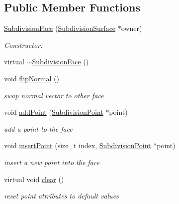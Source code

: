 \subsection*{Public Member Functions}
\begin{DoxyCompactItemize}
\item 
\hyperlink{classShipCAD_1_1SubdivisionFace_a082f81f7a5750f7e53ed5a92ddc82350}{Subdivision\-Face} (\hyperlink{classShipCAD_1_1SubdivisionSurface}{Subdivision\-Surface} $\ast$owner)
\begin{DoxyCompactList}\small\item\em Constructor. \end{DoxyCompactList}\item 
virtual \hyperlink{classShipCAD_1_1SubdivisionFace_a8d6c25b6b03eddb875c25e8cee6ca976}{$\sim$\-Subdivision\-Face} ()
\item 
void \hyperlink{classShipCAD_1_1SubdivisionFace_a16d5e005d1c7c847ccf9ba72b67142fa}{flip\-Normal} ()
\begin{DoxyCompactList}\small\item\em swap normal vector to other face \end{DoxyCompactList}\item 
void \hyperlink{classShipCAD_1_1SubdivisionFace_a553df49a1137f89d2df2846ffca74842}{add\-Point} (\hyperlink{classShipCAD_1_1SubdivisionPoint}{Subdivision\-Point} $\ast$point)
\begin{DoxyCompactList}\small\item\em add a point to the face \end{DoxyCompactList}\item 
void \hyperlink{classShipCAD_1_1SubdivisionFace_aacd383eb085c4f6b92db89e25be6b3a1}{insert\-Point} (size\-\_\-t index, \hyperlink{classShipCAD_1_1SubdivisionPoint}{Subdivision\-Point} $\ast$point)
\begin{DoxyCompactList}\small\item\em insert a new point into the face \end{DoxyCompactList}\item 
virtual void \hyperlink{classShipCAD_1_1SubdivisionFace_a413ae7e76f559780c8a69e998974fb75}{clear} ()
\begin{DoxyCompactList}\small\item\em reset point attributes to default values \end{DoxyCompactList}\item 

\end{DoxyCompactItemize}
